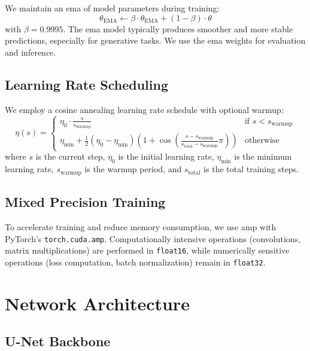 We maintain an \gls{ema} of model parameters during training:
%
\begin{equation}
\theta_{\text{EMA}} \gets \beta \cdot \theta_{\text{EMA}} + (1 - \beta) \cdot \theta
\end{equation}
%
with $\beta = 0.9995$. The \gls{ema} model typically produces smoother and more stable predictions, especially for generative tasks. We use the \gls{ema} weights for evaluation and inference.

\subsection{Learning Rate Scheduling}

We employ a cosine annealing learning rate schedule with optional warmup:
%
\begin{equation}
\eta(s) = \begin{cases}
\eta_0 \cdot \frac{s}{s_{\text{warmup}}} & \text{if } s < s_{\text{warmup}} \\
\eta_{\text{min}} + \frac{1}{2}(\eta_0 - \eta_{\text{min}})\left(1 + \cos\left(\frac{s - s_{\text{warmup}}}{s_{\text{total}} - s_{\text{warmup}}} \pi\right)\right) & \text{otherwise}
\end{cases}
\label{eq:lr_schedule}
\end{equation}
%
where $s$ is the current step, $\eta_0$ is the initial learning rate, $\eta_{\text{min}}$ is the minimum learning rate, $s_{\text{warmup}}$ is the warmup period, and $s_{\text{total}}$ is the total training steps.

\subsection{Mixed Precision Training}

To accelerate training and reduce memory consumption, we use \gls{amp} with PyTorch's \texttt{torch.cuda.amp}. Computationally intensive operations (convolutions, matrix multiplications) are performed in \texttt{float16}, while numerically sensitive operations (loss computation, batch normalization) remain in \texttt{float32}.

\section{Network Architecture}

\subsection{U-Net Backbone}

